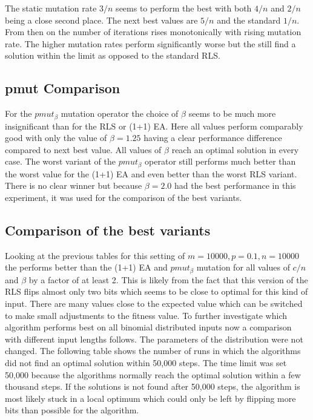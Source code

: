 

The static mutation rate $3/n$ seems to perform the best with both $4/n$ and $2/n$ being a close second place.
The next best values are $5/n$ and the standard $1/n$.
From then on the number of iterations rises monotonically with rising mutation rate.
The higher mutation rates perform significantly worse but the still find a solution within the limit as opposed to the standard RLS.
\subsection{pmut Comparison}


For the $pmut_\beta$ mutation operator the choice of $\beta$ seems to be much more insignificant than for the RLS or (1+1) EA. Here all values perform comparably good with only the value of $\beta = 1.25$ having a clear performance difference compared to next best value. All values of $\beta$ reach an optimal solution in every case. The worst variant of the $pmut_\beta$ operator still performs much better than the worst value for the (1+1) EA and even better than the worst RLS variant. There is no clear winner but because $\beta=2.0$ had the best performance in this experiment, it was used for the comparison of the best variants.
\subsection{Comparison of the best variants}
% 
% 
Looking at the previous tables for this setting of $m=10000, p=0.1, n=10000$ the \RLSN[2] performs better than the  (1+1) EA and $pmut_\beta$ mutation for all values of $c/n$ and $\beta$ by a factor of at least 2.
This is likely from the fact that this version of the RLS flips almost only two bits which seems to be close to optimal for this kind of input.
There are many values close to the expected value which can be switched to make small adjustments to the fitness value.
To further investigate which algorithm performs best on all binomial distributed inputs now a comparison with different input lengths follows.
The parameters of the distribution were not changed.\newline
The following table shows the number of runs in which the algorithms did not find an optimal solution within 50,000 steps.
The time limit was set 50,000 because the algorithms normally reach the optimal solution within a few thousand steps.
If the solutions is not found after 50,000 steps, the algorithm is most likely stuck in a local optimum which could only be left by flipping more bits than possible for the algorithm.


